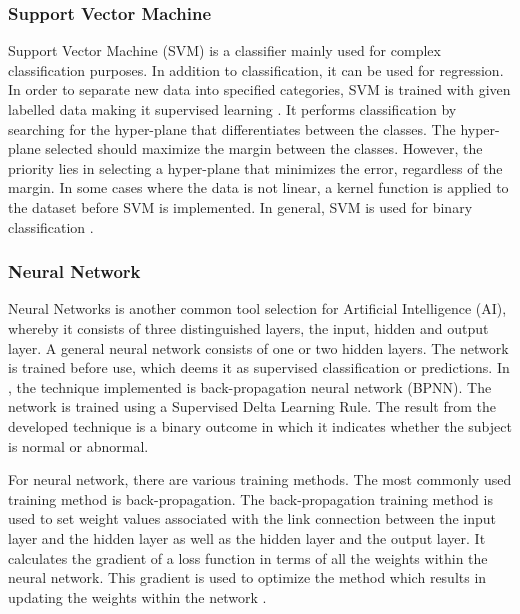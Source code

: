 \documentclass[11pt,twocolumn]{witseiepaper}
\begin{document}
	\subsubsection{Support Vector Machine}
	Support Vector Machine (SVM) is a classifier mainly used for complex classification purposes. In addition to classification, it can be used for regression. In order to separate new data into specified categories, SVM is trained with given labelled data making it supervised learning \cite{saha_classifying_2016}. It performs classification by searching for the hyper-plane that differentiates between the classes. The hyper-plane selected should maximize the margin between the classes. However, the priority lies in selecting a hyper-plane that minimizes the error, regardless of the margin. 
	In some cases where the data is not linear, a kernel function is applied to the dataset before SVM is implemented. In general, SVM is used for binary classification \cite{Rebentrost2014}.
	
	\subsubsection{Neural Network}
	Neural Networks is another common tool selection for Artificial Intelligence (AI), whereby it consists of three distinguished layers, the input, hidden and output layer. A general neural network consists of one or two hidden layers. The network is trained before use, which deems it as supervised classification or predictions. In \cite{jyothi_congenital_2016}, the technique implemented is back-propagation neural network (BPNN). The network is trained using a Supervised Delta Learning Rule. The result from the developed technique is a binary outcome in which it indicates whether the subject is normal or abnormal.
	
	For neural network, there are various training methods. The most commonly used training method is back-propagation. The back-propagation training method is used to set weight values associated with the link connection between the input layer and the hidden layer as well as the hidden layer and the output layer. It calculates the gradient of a loss function in terms of all the weights within the neural network. This gradient is used to optimize the method which results in updating the weights within the network \cite{Oukrich2016}.
	
\end{document}

